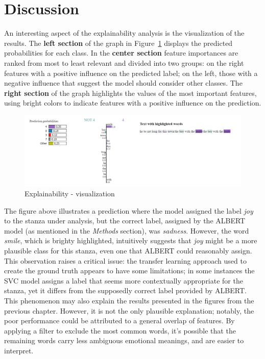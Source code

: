 \chapter*{Discussion}
\label{ch:discussion}

An interesting aspect of the explainability analysis is the visualization of the results.
The \textbf{left section} of the graph in Figure~\ref{fig:expl} displays the predicted probabilities for each class. In the \textbf{center section}
feature importances are ranked from most to least relevant and divided into two groups: on the right
features with a positive influence on the predicted label; on the left, those with a negative influence that suggest the model should consider other classes.
The \textbf{right section} of the graph highlights the values of the most important
features, using bright colors to indicate features with a positive influence on the prediction.

\begin{figure}[H]
    \centering
    \includegraphics[scale= 0.55]{pictures/expl.png}
    \caption{Explainability - visualization}
    \label{fig:expl}
\end{figure}

The figure above illustrates a prediction where the model assigned the label \textit{joy} to the stanza under analysis, but the correct label, assigned by the ALBERT model (as mentioned in the \textit{Methods} section), was \textit{sadness}.
However, the word \textit{smile}, which is brighty highlighted, intuitively suggests that \textit{joy} might be a more plausible class for this stanza, even one that ALBERT could reasonably assign. 
This observation raises a critical issue: the transfer learning approach used to create the ground truth appears to have some limitations; in some instances the SVC model assigns a label that seems more contextually appropriate for the stanza, 
yet it differs from the supposedly correct label provided by ALBERT.\\

This phenomenon may also explain the results presented in the figures from the
previous chapter.
However, it is not the only plausible explanation; notably, the poor performance
could be attributed to a general overlap of features.
By applying a filter to exclude the most common words, it's possible that the
remaining words carry less ambiguous emotional meanings, and are easier to interpret.

